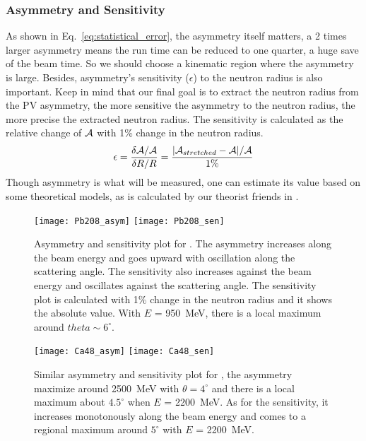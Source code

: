 \subsubsection{Asymmetry and Sensitivity}
As shown in Eq.~\ref{eq:statistical_error}, the asymmetry itself matters,
a 2 times larger asymmetry means the run time can be reduced to one quarter,
a huge save of the beam time. So we should choose a kinematic region where
the asymmetry is large. Besides, asymmetry's sensitivity ($\epsilon$) to the neutron radius 
is also important. Keep in mind that our final goal is to extract the neutron radius
from the PV asymmetry, the more sensitive the asymmetry to the neutron radius, the
more precise the extracted neutron radius. The sensitivity is calculated
as the relative change of $\mathcal{A}$ with 1\% change in the neutron radius.
\begin{equation}
    \epsilon = \frac{\delta \mathcal{A}/\mathcal{A}}{\delta R/R} = \frac{|\mathcal{A}_{stretched} - \mathcal{A}|/\mathcal{A}}{1\%}
\end{equation}
Though asymmetry is what will be measured, one can estimate its value based
on some theoretical models, as is calculated by our theorist friends in \cite{PhysRevC.57.3430}.
\begin{figure}[!h]
    \texttt{[image: Pb208\_asym]}
    \texttt{[image: Pb208\_sen]}
    \caption[Asymmetry and sensitivity for \Pb]
    {Asymmetry and sensitivity plot for \Pb. The asymmetry increases along 
    the beam energy and goes upward with oscillation along the scattering angle. 
    The sensitivity also increases against the beam energy and oscillates against
    the scattering angle.  The sensitivity plot is calculated with 1\% change in 
    the neutron radius and it shows the absolute value.
    With $E$ = 950~MeV, there is a local maximum around $theta \sim 6^\circ$.
    }
\end{figure}
\begin{figure}[!h]
    \texttt{[image: Ca48\_asym]}
    \texttt{[image: Ca48\_sen]}
    \caption[Asymmetry and sensitivity for \Ca]
    {Similar asymmetry and sensitivity plot for \Ca, the asymmetry maximize 
    around 2500~MeV with $\theta = 4^\circ$ and there is a local maximum 
    about $4.5^\circ$ when $E$ = 2200~MeV. As for the sensitivity, it increases
    monotonously along the beam energy and comes to a regional maximum around $5^\circ$
    with $E$ = 2200~MeV.
    }
    \label{fig:ca48_asym_sen}
\end{figure}

